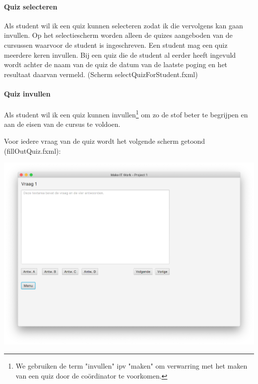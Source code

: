 \documentclass[11pt, a4paper]{article}
\begin{document}
\paragraph{Quiz selecteren}
Als student wil ik een quiz kunnen selecteren zodat ik die vervolgens kan gaan invullen.
Op het selectiescherm worden alleen de quizes aangeboden van de cursussen waarvoor de student is ingeschreven.
Een student mag een quiz meerdere keren invullen.
Bij een quiz die de student al eerder heeft ingevuld wordt achter de naam van de quiz de datum van de laatste poging en het resultaat daarvan vermeld.
(Scherm selectQuizForStudent.fxml)

\paragraph{Quiz invullen}
Als student wil ik een quiz kunnen invullen\footnote{We gebruiken de term "invullen" ipv "maken" om verwarring met het maken van een quiz door de co\"ordinator te voorkomen.} om zo de stof beter te begrijpen en aan de eisen van de cursus te voldoen.

Voor iedere vraag van de quiz wordt het volgende scherm getoond (fillOutQuiz.fxml):

\begin{center}
\includegraphics[width=\linewidth]{Screenshot_fillOutQuiz.png}
\end{center}
\end{document}
